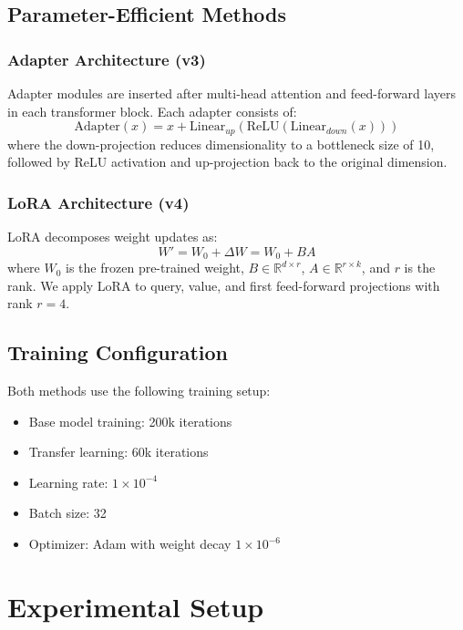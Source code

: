 \documentclass[conference]{IEEEtran}
\begin{document}
\subsection{Parameter-Efficient Methods}

\subsubsection{Adapter Architecture (v3)}
Adapter modules are inserted after multi-head attention and feed-forward layers in each transformer block. Each adapter consists of:
\begin{equation}
\text{Adapter}(x) = x + \text{Linear}_{up}(\text{ReLU}(\text{Linear}_{down}(x)))
\end{equation}
where the down-projection reduces dimensionality to a bottleneck size of 10, followed by ReLU activation and up-projection back to the original dimension.

\subsubsection{LoRA Architecture (v4)}
LoRA decomposes weight updates as:
\begin{equation}
W' = W_0 + \Delta W = W_0 + BA
\end{equation}
where $W_0$ is the frozen pre-trained weight, $B \in \mathbb{R}^{d \times r}$, $A \in \mathbb{R}^{r \times k}$, and $r$ is the rank. We apply LoRA to query, value, and first feed-forward projections with rank $r=4$.

\subsection{Training Configuration}

Both methods use the following training setup:
\begin{itemize}
\item Base model training: 200k iterations
\item Transfer learning: 60k iterations
\item Learning rate: $1 \times 10^{-4}$
\item Batch size: 32
\item Optimizer: Adam with weight decay $1 \times 10^{-6}$
\end{itemize}

\section{Experimental Setup}
\end{document}
